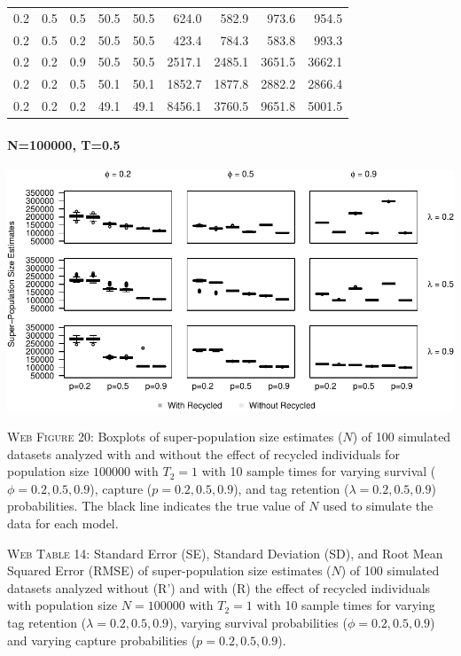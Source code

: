 \documentclass[]{article}
\let\oldparagraph\paragraph
\renewcommand{\paragraph}[1]{\oldparagraph{#1}\mbox{}}
\begin{document}
\begin{table}[ht]
{\begin{tabular}{rrrrrrrrr}
  0.2 & 0.5 & 0.5 & 50.5 & 50.5 & 624.0 & 582.9 & 973.6 & 954.5 \\ 
  0.2 & 0.5 & 0.2 & 50.5 & 50.5 & 423.4 & 784.3 & 583.8 & 993.3 \\ 
  0.2 & 0.2 & 0.9 & 50.5 & 50.5 & 2517.1 & 2485.1 & 3651.5 & 3662.1 \\ 
  0.2 & 0.2 & 0.5 & 50.1 & 50.1 & 1852.7 & 1877.8 & 2882.2 & 2866.4 \\ 
  0.2 & 0.2 & 0.2 & 49.1 & 49.1 & 8456.1 & 3760.5 & 9651.8 & 5001.5 \\ 
   \hline
\end{tabular}
}
\endgroup
\end{table}

\newpage

\paragraph{N=100000, T=0.5}\label{n100000-t0.5-3}

\includegraphics{Appendix_BW_files/figure-latex/figure20_superN_GJSTL2-1.pdf}

\textsc{Web Figure 20:} Boxplots of super-population size estimates
(\(N\)) of 100 simulated datasets analyzed with and without the effect
of recycled individuals for population size \(100000\) with \(T_2=1\)
with 10 sample times for varying survival (\(\phi=0.2,0.5,0.9\)),
capture (\(p=0.2,0.5,0.9\)), and tag retention (\(\lambda=0.2,0.5,0.9\))
probabilities. The black line indicates the true value of \(N\) used to
simulate the data for each model.

\textsc{Web Table 14:} Standard Error (SE), Standard Deviation (SD), and
Root Mean Squared Error (RMSE) of super-population size estimates
(\(N\)) of 100 simulated datasets analyzed without (R') and with (R) the
effect of recycled individuals with population size \(N=100000\) with
\(T_2=1\) with 10 sample times for varying tag retention
(\(\lambda=0.2,0.5,0.9\)), varying survival probabilities
(\(\phi=0.2,0.5,0.9\)) and varying capture probabilities
(\(p=0.2,0.5,0.9\)).
\end{document}
